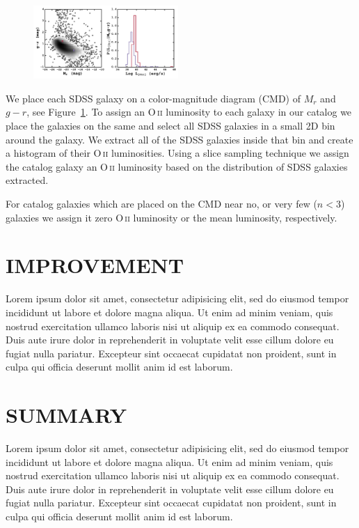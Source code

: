 \documentclass[apj, revtex4]{emulateapj}
\makeatletter
\DeclareRobustCommand{\ion}[2]{%
\relax\ifmmode
\ifx\testbx\f@series
{\mathbf{#1\,\mathsc{#2}}}\else
{\mathrm{#1\,\mathsc{#2}}}\fi
\else\textup{#1\,{\mdseries\textsc{#2}}}%
\fi}
\makeatother
\begin{document}
\begin{figure} 
	\includegraphics[width=0.49\textwidth]{oii_sdss.pdf} 
	\caption{} \label{fig:oii sdss} 
\end{figure}

We place each SDSS galaxy on a color-magnitude diagram (CMD) of $M_r$ and $g-r$, see Figure~\ref{fig:oii sdss}. To assign an \ion{O}{ii} luminosity to each galaxy in our catalog we place the galaxies on the same and select all SDSS galaxies in a small 2D bin around the galaxy. We extract all of the SDSS galaxies inside that bin and create a histogram of their \ion{O}{ii} luminosities. Using a slice sampling technique we assign the catalog galaxy an \ion{O}{ii} luminosity based on the distribution of SDSS galaxies extracted.

For catalog galaxies which are placed on the CMD near no, or very few ($n<3$) galaxies we assign it zero \ion{O}{ii} luminosity or the mean luminosity, respectively.

\section{IMPROVEMENT}
Lorem ipsum dolor sit amet, consectetur adipisicing elit, sed do eiusmod tempor incididunt ut labore et dolore magna aliqua. Ut enim ad minim veniam, quis nostrud exercitation ullamco laboris nisi ut aliquip ex ea commodo consequat. Duis aute irure dolor in reprehenderit in voluptate velit esse cillum dolore eu fugiat nulla pariatur. Excepteur sint occaecat cupidatat non proident, sunt in culpa qui officia deserunt mollit anim id est laborum.
\section{SUMMARY}
Lorem ipsum dolor sit amet, consectetur adipisicing elit, sed do eiusmod tempor incididunt ut labore et dolore magna aliqua. Ut enim ad minim veniam, quis nostrud exercitation ullamco laboris nisi ut aliquip ex ea commodo consequat. Duis aute irure dolor in reprehenderit in voluptate velit esse cillum dolore eu fugiat nulla pariatur. Excepteur sint occaecat cupidatat non proident, sunt in culpa qui officia deserunt mollit anim id est laborum.

\end{document}
